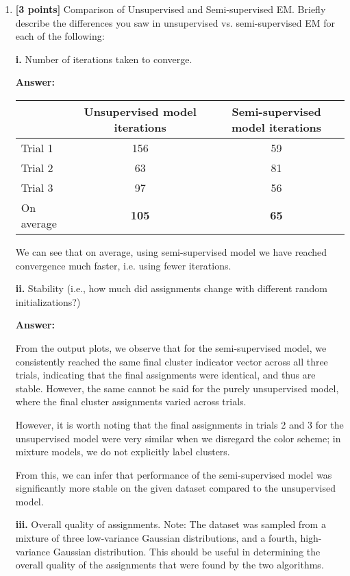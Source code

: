 \documentclass{article}
\begin{document}
\begin{enumerate}[label=(\alph*)]
\item \textbf{[3 points]} Comparison of Unsupervised and Semi-supervised EM. Briefly describe
the differences you saw in unsupervised vs. semi-supervised EM for each of the following:

\textbf{i.} Number of iterations taken to converge.

\textbf{Answer:}

\begin{table}[H]
    \centering
    \begin{tabular}{l|c|c}
         &  Unsupervised model iterations & Semi-supervised model iterations\\
         \hline
         \hline
         Trial 1 & 156 & 59\\[10pt]
         Trial 2 & 63 & 81\\[10pt]
         Trial 3 & 97 & 56\\
         \hline
         On average & \textbf{105} & \textbf{65}
    \end{tabular}
    \label{tab:1}
\end{table}

We can see that on average, using semi-supervised model we have reached convergence much faster, i.e. using fewer iterations.


\textbf{ii.} Stability (i.e., how much did assignments change with different random initializations?) 

\textbf{Answer:}

From the output plots, we observe that for the semi-supervised model, we consistently reached the same final cluster indicator vector across all three trials, indicating that the final assignments were identical, and thus are stable. However, the same cannot be said for the purely unsupervised model, where the final cluster assignments varied across trials.  

However, it is worth noting that the final assignments in trials 2 and 3 for the unsupervised model were very similar when we disregard the color scheme; in mixture models, we do not explicitly label clusters. 

From this, we can infer that performance of the semi-supervised model was significantly more stable on the given dataset compared to the unsupervised model.

\textbf{iii.} Overall quality of assignments.
Note: The dataset was sampled from a mixture of three low-variance Gaussian distributions, and a fourth, high-variance Gaussian distribution. This should be useful in determining the overall quality of the assignments that were found by the two algorithms.


\end{enumerate}
\end{document}

